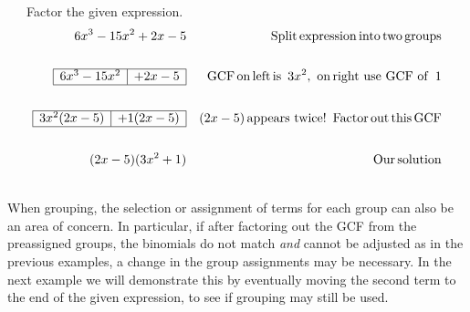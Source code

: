 \begin{example}~~~Factor the given expression.
  \begin{eqnarray*}
    6 x^3 - 15 x^2 + 2 x - 5 &  & \operatorname{Split} \operatorname{expression} \operatorname{into}
    \operatorname{two} \operatorname{groups}\\
   &&\\
	  \begin{array}{|l|l|}
      \hline
      6 x^3 - 15 x^2 & + 2 x - 5\\
      \hline
    \end{array} &  & \operatorname{GCF} \operatorname{on} \operatorname{left} \operatorname{is~} 3 x^2,
    \operatorname{~on} \operatorname{right~use~GCF~of~} 1\\
   &&\\
	  \begin{array}{|l|l|}
      \hline
      3 x^2 (2 x - 5) & + 1 (2 x - 5)\\
      \hline
    \end{array} &  & (2 x - 5) \operatorname{appears~twice} !
    \operatorname{~Factor} \operatorname{out} \operatorname{this} \operatorname{GCF}\\
   &&\\
	  (2 x - 5) (3 x^2 + 1) &  & \operatorname{Our} \operatorname{solution}
  \end{eqnarray*}
\end{example}
 ~\\
When grouping, the selection or assignment of terms for each group can also be an area of concern.  In particular, if after factoring out the GCF from the preassigned groups, the binomials do not match \textit{and} cannot be adjusted as in the previous examples, a change in the group assignments may be necessary.  In the next example we will demonstrate this by eventually moving the second term to the end of the given expression, to see if grouping may still be used.

